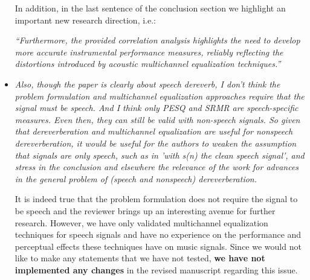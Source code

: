 \documentclass[10pt, a4paper]{article}
\begin{document}
\begin{itemize}
In addition, in the last sentence of the conclusion section we highlight an important new research direction, i.e.:

{\emph{``Furthermore, the provided correlation analysis highlights the need to develop more accurate instrumental performance measures, reliably reflecting the distortions introduced by acoustic multichannel equalization techniques.''}}

\item {\textit{Also, though the paper is clearly about speech dereverb, I don't think the problem formulation and multichannel equalization approaches require that the signal must be speech. And I think only PESQ and SRMR are speech-specific measures. Even then, they can still be valid with non-speech signals. So given that dereverberation and multichannel equalization are useful for nonspeech dereverberation, it would be useful for the authors to weaken the assumption that signals are only speech, such as in 'with s(n) the clean speech signal', and stress in the conclusion and elsewhere the relevance of the work for advances in the general problem of (speech and nonspeech) dereverberation.}}

It is indeed true that the problem formulation does not require the signal to be speech and the reviewer brings up an interesting avenue for further research. 
However, we have only validated multichannel equalization techniques for speech signals and have no experience on the performance and perceptual effects these techniques have on music signals.
Since we would not like to make any statements that we have not tested, {\textbf{we have not implemented any changes}} in the revised manuscript regarding this issue.


\end{itemize}
\end{document}
